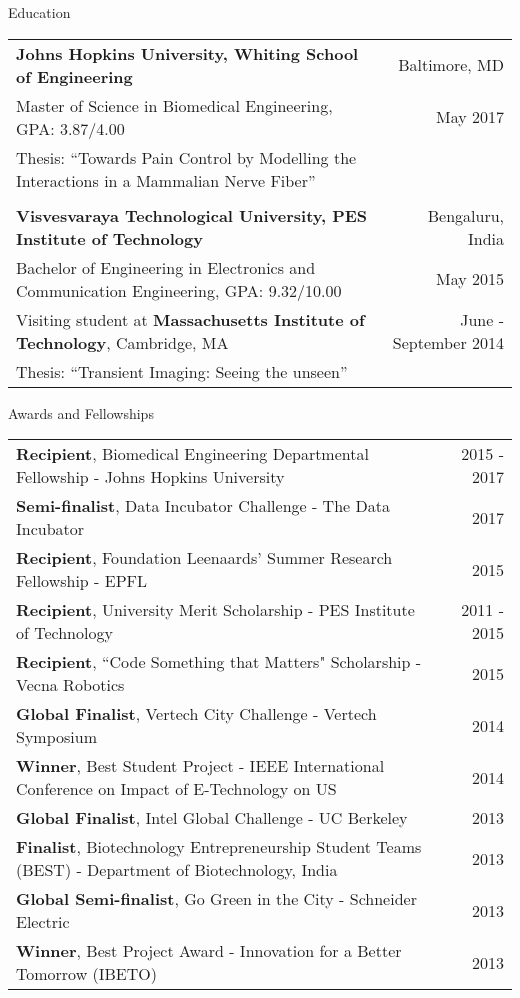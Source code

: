 \documentclass{resume}
\begin{document}
\thispagestyle{empty}
  \begin{rSection}{Education}
\begin{tabular*}{\textwidth}{@{\extracolsep{\fill}}lr@{}}
\textbf{Johns Hopkins University, Whiting School of Engineering} & Baltimore, MD \\
{Master of Science in Biomedical Engineering}, GPA: 3.87/4.00 & May 2017 \\
Thesis: {``Towards Pain Control by Modelling the Interactions in a Mammalian Nerve Fiber''}\\ \\
\textbf{Visvesvaraya Technological University, PES Institute of Technology} & Bengaluru, India \\
{Bachelor of Engineering in Electronics and Communication Engineering}, GPA: 9.32/10.00 & May 2015 \\
Visiting student at \textbf{Massachusetts Institute of Technology}, Cambridge, MA & June - September 2014 \\
Thesis: {``Transient Imaging: Seeing the unseen''}\\
\end{tabular*}
  \end{rSection}

\vspace{1em}

        \begin{rSection}{Awards and Fellowships}
\begin{tabular*}{\textwidth}{@{\extracolsep{\fill}}lr@{}}
\textbf{Recipient}, Biomedical Engineering Departmental Fellowship - Johns Hopkins University & 2015 - 2017\\ 
\textbf{Semi-finalist}, Data Incubator Challenge - The Data Incubator & 2017\\
\textbf{Recipient}, Foundation Leenaards' Summer Research Fellowship - EPFL &  2015\\
\textbf{Recipient}, University Merit Scholarship - PES Institute of Technology & 2011 - 2015 \\ 
\textbf{Recipient}, ``Code Something that Matters" Scholarship - Vecna Robotics & 2015\\
\textbf{Global Finalist}, Vertech City Challenge - Vertech Symposium  & 2014\\
\textbf{Winner}, Best Student Project - IEEE International Conference on Impact of E-Technology on US & 2014\\
\textbf{Global Finalist}, Intel Global Challenge -  UC Berkeley & 2013 \\
\textbf{Finalist}, Biotechnology Entrepreneurship Student Teams (BEST) - Department of Biotechnology, India & 2013\\
\textbf{Global Semi-finalist}, Go Green in the City - Schneider Electric & 2013 \\
\textbf{Winner}, Best Project Award - Innovation for a Better Tomorrow (IBETO)  & 2013\\
\end{tabular*}
    \end{rSection}
\end{document}

